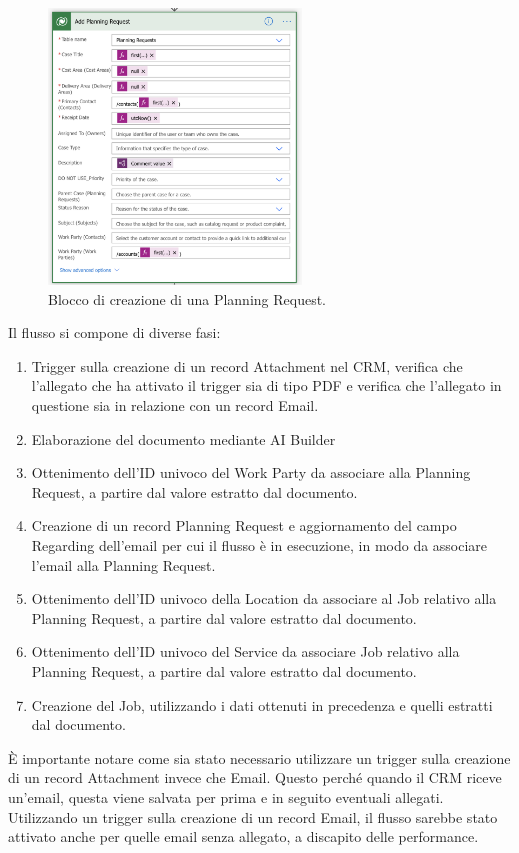 \begin{figure}[ht]
  \centering
  \includegraphics[width=0.6\textwidth]{planning-request-block.png}
  \caption{Blocco di creazione di una Planning Request.}
  \label{fig:bloccoPlanningRequest}
\end{figure}
Il flusso si compone di diverse fasi:
\begin{enumerate}
  \item Trigger sulla creazione di un record Attachment nel CRM, verifica che l'allegato che ha attivato il trigger sia di tipo PDF e verifica che l'allegato in questione sia in relazione con un record Email.
  \item Elaborazione del documento mediante AI Builder
  \item Ottenimento dell'ID univoco del Work Party da associare alla Planning Request, a partire dal valore estratto dal documento.
  \item Creazione di un record Planning Request e aggiornamento del campo Regarding dell'email per cui il flusso è in esecuzione, in modo da associare l'email alla Planning Request.
  \item Ottenimento dell'ID univoco della Location da associare al Job relativo alla Planning Request, a partire dal valore estratto dal documento.
  \item Ottenimento dell'ID univoco del Service da associare Job relativo alla Planning Request, a partire dal valore estratto dal documento.
  \item Creazione del Job, utilizzando i dati ottenuti in precedenza e quelli estratti dal documento.
\end{enumerate}

È importante notare come sia stato necessario utilizzare un trigger sulla creazione di un record Attachment invece che Email. Questo perché quando il CRM riceve un'email, questa viene salvata per prima e in seguito eventuali allegati. Utilizzando un trigger sulla creazione di un record Email, il flusso sarebbe stato attivato anche per quelle email senza allegato, a discapito delle performance.

